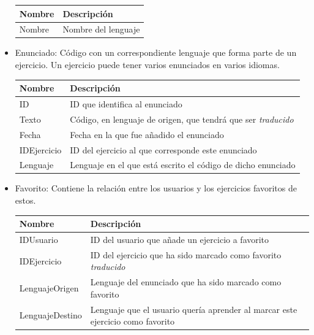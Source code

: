 \begin{itemize}
\begin{tabularx}{15cm}{|l|X|}
\hline
\textbf{Nombre} & \textbf{Descripción}                                                              \\ \hline
Nombre       & Nombre del lenguaje \\ \hline
\end{tabularx}
\vspace{1em}

\item Enunciado: Código con un correspondiente lenguaje que forma parte de un ejercicio. Un ejercicio puede tener varios enunciados en varios idiomas.

\begin{tabularx}{15cm}{|l|X|}
\hline
\textbf{Nombre} & \textbf{Descripción}                                                              \\ \hline
ID       & ID que identifica al enunciado \\ \hline
Texto     & Código, en lenguaje de origen, que tendrá que ser \emph{traducido}                                           \\ \hline
Fecha     & Fecha en la que fue añadido el enunciado                                           \\ \hline
IDEjercicio     & ID del ejercicio al que corresponde este enunciado                                           \\ \hline
Lenguaje     & Lenguaje en el que está escrito el código de dicho enunciado                                           \\ \hline
\end{tabularx}
\vspace{1em}

\item Favorito: Contiene la relación entre los usuarios y los ejercicios favoritos de estos.

\begin{tabularx}{15cm}{|l|X|}
\hline
\textbf{Nombre} & \textbf{Descripción}                                                              \\ \hline
IDUsuario       & ID del usuario que añade un ejercicio a favorito \\ \hline
IDEjercicio     & ID del ejercicio que ha sido marcado como favorito \emph{traducido}                                           \\ \hline
LenguajeOrigen     & Lenguaje del enunciado que ha sido marcado como favorito                                           \\ \hline
LenguajeDestino     & Lenguaje que el usuario quería aprender al marcar este ejercicio como favorito                                           \\ \hline
\end{tabularx}
\vspace{1em}


\end{itemize}
